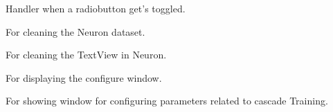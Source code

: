 \documentclass[letterpaper,10pt,english]{sphinxmanual}
\begin{document}
\begin{fulllineitems}
\begin{fulllineitems}
\end{fulllineitems}



\begin{fulllineitems}
\label{index:neuron.neuron.on_algorithm_selected}
Handler when a radiobutton get's toggled.

\end{fulllineitems}



\begin{fulllineitems}
\label{index:neuron.neuron.on_clean}
For cleaning the Neuron dataset.

\end{fulllineitems}



\begin{fulllineitems}
\label{index:neuron.neuron.on_cleantext_click}
For cleaning the TextView in Neuron.

\end{fulllineitems}



\begin{fulllineitems}
\label{index:neuron.neuron.on_configure_menuitem_activate}
For displaying the configure window.

\end{fulllineitems}



\begin{fulllineitems}
\label{index:neuron.neuron.on_evolving_train_config_activate}
For showing window for configuring parameters related to cascade
Training.

\end{fulllineitems}



\end{fulllineitems}
\end{document}
